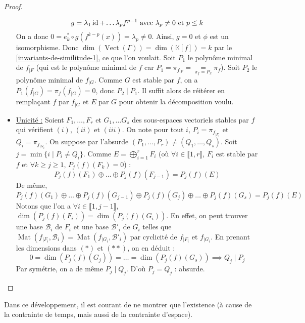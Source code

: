 \begin{proof}
\begin{itemize}
			\[ g = \lambda_1 \operatorname{id} + \dots \lambda_p f^{p-1} \text{ avec } \lambda_p \neq 0 \text{ et } p \leq k \]
			On a donc $0 = e_k^* \circ g(f^{k-p} (x)) = \lambda_p \neq 0$. Ainsi, $g = 0$ et $\phi$ est un isomorphisme. Donc $\dim(\operatorname{Vect}(\Gamma)) = \dim(\mathbb{K}[f]) = k$ par le \cref{invariants-de-similitude-1}, ce que l'on voulait.
			\newpar
			Soit $P_1$ le polynôme minimal de $f_{|F}$ (qui est le polynôme minimal de $f$ car $P_1 = \pi_{f_{|F}} = \underset{\pi_f = P_x}{=} \pi_f$). Soit $P_2$ le polynôme minimal de $f_{|G}$. Comme $G$ est stable par $f$, on a $P_1(f_{|G}) = \pi_f(f_{|G}) = 0$, donc $P_2 \mid P_1$. Il suffit alors de réitérer en remplaçant $f$ par $f_{|G}$ et $E$ par $G$ pour obtenir la décomposition voulu.
			\item \uline{Unicité :} Soient $F_1, \dots, F_r$ et $G_1, \dots G_s$ des sous-espaces vectoriels stables par $f$ qui vérifient $(i)$, $(ii)$ et $(iii)$. On note pour tout $i$, $P_i = \pi_{f_{|F_i}}$ et $Q_i = \pi_{f_{|G_i}}$. On suppose par l'absurde $(P_1, \dots, P_r) \neq (Q_1, \dots, Q_s)$. Soit $j = \min\{ i \mid P_i \neq Q_i \}$.
			Comme $E = \bigoplus_{i = 1}^r F_i$ (où $\forall i \in \llbracket 1, r \rrbracket$, $F_i$ est stable par $f$ et $\forall k \geq j \geq 1$, $P_j(f)(F_k) = 0$) :
			\[ P_j(f)(F_1) \oplus \dots \oplus P_j(f)(F_{j-1}) = P_j(f)(E) \tag{$*$} \]
			De même,
			\[ P_j(f)(G_1) \oplus \dots \oplus P_j(f)(G_{j-1}) \oplus P_j(f)(G_j) \oplus \dots \oplus P_j(f)(G_s) = P_j(f)(E) \tag{$**$} \]
			Notons que l'on a $\forall i \in \llbracket 1, j-1 \rrbracket$, $\dim(P_j(f)(F_i)) = \dim(P_j(f)(G_i))$. En effet, on peut trouver une base $\mathcal{B}_i$ de $F_i$ et une base $\mathcal{B}'_i$ de $G_i$ telles que $\operatorname{Mat}(f_{|F_i}, \mathcal{B}_i) = \operatorname{Mat}(f_{|G_i}, \mathcal{B}'_i)$ par cyclicité de $f_{|F_i}$ et $f_{|G_i}$. En prenant les dimensions dans $(*)$ et $(**)$, on en déduit :
			\[ 0 = \dim(P_j(f)(G_j)) = \dots = \dim(P_j(f)(G_s)) \implies Q_j \mid P_j \]
			Par symétrie, on a de même $P_j \mid Q_j$. D'où $P_j = Q_j$ : absurde.
		\end{itemize}
	\end{proof}

	\begin{remark}
		Dans ce développement, il est courant de ne montrer que l'existence (à cause de la contrainte de temps, mais aussi de la contrainte d'espace).
	\end{remark}

